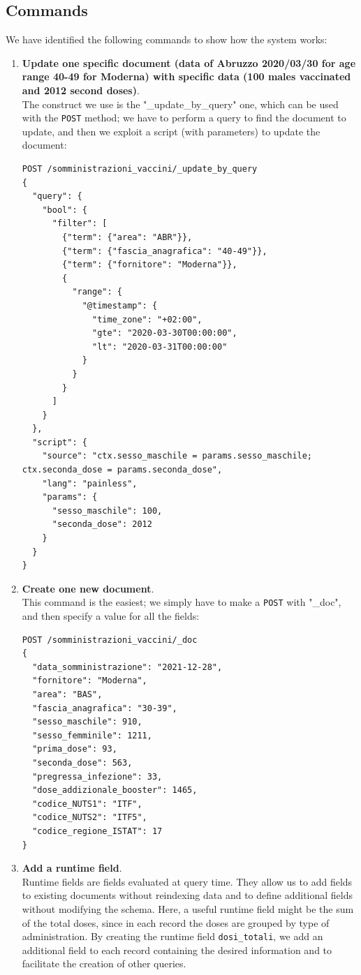 \documentclass{article}
\begin{document}
\subsection{Commands}
We have identified the following commands to show how the system works:\\
\begin{enumerate}
    \item \textbf{Update one specific document (data of Abruzzo 2020/03/30 for age range 40-49 for Moderna) with specific data (100 males vaccinated and 2012 second doses)}.\\
    The construct we use is the "\_update\_by\_query" one, which can be used with the \verb|POST| method; we have to perform a query to find the document to update, and then we exploit a script (with parameters) to update the document:
\begin{lstlisting}
POST /somministrazioni_vaccini/_update_by_query
{
  "query": {
    "bool": {
      "filter": [
        {"term": {"area": "ABR"}},
        {"term": {"fascia_anagrafica": "40-49"}},
        {"term": {"fornitore": "Moderna"}},
        {
          "range": {
            "@timestamp": {
              "time_zone": "+02:00",
              "gte": "2020-03-30T00:00:00",
              "lt": "2020-03-31T00:00:00"
            }
          }
        }
      ]
    }
  },
  "script": {
    "source": "ctx.sesso_maschile = params.sesso_maschile; ctx.seconda_dose = params.seconda_dose",
    "lang": "painless",
    "params": {
      "sesso_maschile": 100,
      "seconda_dose": 2012
    }
  }
}
\end{lstlisting}
\item \textbf{Create one new document}.\\
This command is the easiest; we simply have to make a \verb|POST| with "\_doc", and then specify a value for all the fields:
\begin{lstlisting}
POST /somministrazioni_vaccini/_doc
{
  "data_somministrazione": "2021-12-28",
  "fornitore": "Moderna",
  "area": "BAS",
  "fascia_anagrafica": "30-39",
  "sesso_maschile": 910,
  "sesso_femminile": 1211,
  "prima_dose": 93,
  "seconda_dose": 563,
  "pregressa_infezione": 33,
  "dose_addizionale_booster": 1465,
  "codice_NUTS1": "ITF",
  "codice_NUTS2": "ITF5",
  "codice_regione_ISTAT": 17
}
\end{lstlisting}
\item \textbf{Add a runtime field}.\\
Runtime fields are fields evaluated at query time. They allow us to add fields to existing documents without reindexing data and to define additional fields without modifying the schema. Here, a useful runtime field might be the sum of the total doses, since in each record the doses are grouped by type of administration. By creating the runtime field \verb|dosi_totali|, we add an additional field to each record containing the desired information and to facilitate the creation of other queries.

\end{enumerate}
\end{document}

